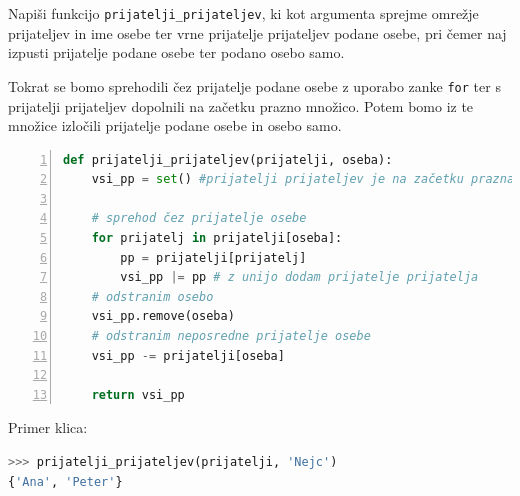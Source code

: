 \begin{zgled}
Napiši funkcijo \texttt{prijatelji\_prijateljev}, ki kot argumenta sprejme omrežje prijateljev in ime osebe ter vrne prijatelje prijateljev podane osebe, pri čemer naj izpusti prijatelje podane osebe ter podano osebo samo.
\end{zgled}
\begin{resitev}
Tokrat se bomo sprehodili čez prijatelje podane osebe z uporabo zanke \texttt{for} ter s prijatelji prijateljev dopolnili na začetku prazno množico. Potem bomo iz te množice izločili prijatelje podane osebe in osebo samo.
\begin{lstlisting}[language=Python, showstringspaces=false,numbers=left]
def prijatelji_prijateljev(prijatelji, oseba):
    vsi_pp = set() #prijatelji prijateljev je na začetku prazna
    
    # sprehod čez prijatelje osebe
    for prijatelj in prijatelji[oseba]:
        pp = prijatelji[prijatelj]
        vsi_pp |= pp # z unijo dodam prijatelje prijatelja
    # odstranim osebo
    vsi_pp.remove(oseba)
    # odstranim neposredne prijatelje osebe
    vsi_pp -= prijatelji[oseba]
    
    return vsi_pp

\end{lstlisting}
Primer klica:
\begin{lstlisting}[language=Python, showstringspaces=false]
>>> prijatelji_prijateljev(prijatelji, 'Nejc')
{'Ana', 'Peter'}
\end{lstlisting}
\end{resitev}


